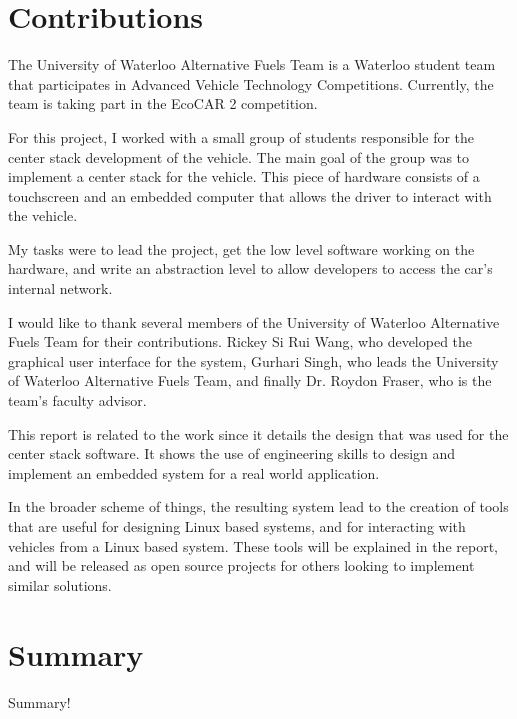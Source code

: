 \documentclass[ece]{uw-wkrpt}
\begin{document}
\begin{onehalfspacing}
\section{Contributions}

The University of Waterloo Alternative Fuels Team is a Waterloo student
team that participates in Advanced Vehicle Technology Competitions. Currently,
the team is taking part in the EcoCAR 2 competition.

For this project, I worked with a small group of students responsible for the
center stack development of the vehicle. The main goal of the group was to
implement a center stack for the vehicle. This piece of hardware consists of a
touchscreen and an embedded computer that allows the driver to interact with the
vehicle.

My tasks were to lead the project, get the low level software working on the
hardware, and write an abstraction level to allow developers to access the car's
internal network.

I would like to thank several members of the University of Waterloo Alternative
Fuels Team for their contributions.
Rickey Si Rui Wang, who developed the graphical user interface for the system,
Gurhari Singh, who leads the University of Waterloo Alternative Fuels Team, and
finally Dr. Roydon Fraser, who is the team's faculty advisor.

This report is related to the work since it details the design that was used for
the center stack software. It shows the use of engineering skills to design and
implement an embedded system for a real world application.

In the broader scheme of things, the resulting system lead to the creation of
tools that are useful for designing Linux based systems, and for interacting
with vehicles from a Linux based system. These tools will be explained in the
report, and will be released as open source projects for others looking to
implement similar solutions.

\section{Summary}

Summary!

\end{onehalfspacing}

\tableofcontents
\listoffigures
\listoftables
\end{document}
